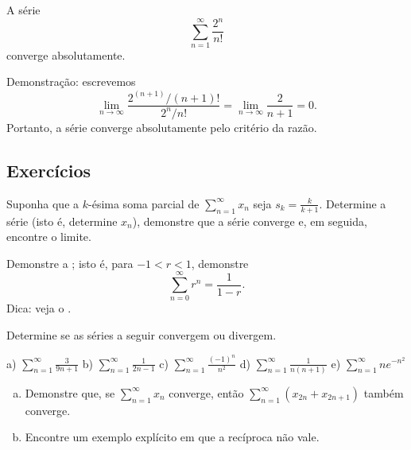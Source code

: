 \begin{example}
A série
\begin{equation*}
\sum_{n=1}^\infty \frac{2^n}{n!}
\end{equation*}
converge absolutamente.

Demonstração: escrevemos
\begin{equation*}
\lim_{n\to\infty} \frac{2^{(n+1)}/(n+1)!}{2^n / n!} =
\lim_{n\to\infty} \frac{2}{n+1} = 0 .
\end{equation*}
Portanto, a série converge absolutamente pelo critério da razão.
\end{example}

\subsection{Exercícios}

\begin{exercise}
Suponha que a $k$-ésima soma parcial de $\displaystyle \sum_{n=1}^\infty x_n$ seja $s_k = \frac{k}{k+1}$.
Determine a série (isto é, determine $x_n$), demonstre que a série converge e,
em seguida, encontre o limite.
\end{exercise}

\begin{exercise} \label{geometric:exr}
Demonstre a ; isto é, para $-1 < r < 1$, demonstre
\begin{equation*}
\sum_{n=0}^\infty r^n = \frac{1}{1-r} .
\end{equation*}
Dica: veja o .
\end{exercise}

\begin{exercise}
Determine se as séries a seguir convergem ou divergem.

\medskip

\noindent
a)
$\displaystyle \sum_{n=1}^\infty \frac{3}{9n+1}$
\qquad
b)
$\displaystyle \sum_{n=1}^\infty \frac{1}{2n-1}$
\qquad
c)
$\displaystyle \sum_{n=1}^\infty \frac{{(-1)}^n}{n^2}$
\qquad
d)
$\displaystyle \sum_{n=1}^\infty \frac{1}{n(n+1)}$
\qquad
e)
$\displaystyle \sum_{n=1}^\infty n e^{-n^2}$
\end{exercise}

\begin{samepage}
\begin{exercise}
\leavevmode
\begin{enumerate}[a)]
\item Demonstre que, se
$\displaystyle
\sum_{n=1}^\infty x_n
$
converge, então
$\displaystyle
\sum_{n=1}^\infty ( x_{2n} + x_{2n+1} )
$
também converge.
\item
Encontre um exemplo explícito em que a recíproca não vale.
\end{enumerate}
\end{exercise}
\end{samepage}

